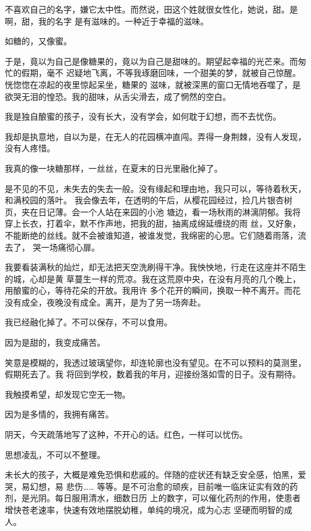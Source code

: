 		不喜欢自己的名字，嫌它太中性。而然说，田这个姓就很女性化，她说，甜。是啊，甜，我的名字
	是有滋味的。一种近于幸福的滋味。

		如糖的，又像蜜。

		于是，竟以为自己是像糖果的，竟以为自己是甜味的。期望起幸福的光芒来。而匆忙的假期，毫不
	迟疑地飞离，不等我琢磨回味，一个甜美的梦，就被自己惊醒。恍惚惚在凉起的夜里惊起呆坐，糖果的
	滋味，就被深黑的窗口无情地吞噬了，是欲哭无泪的惶恐。我的甜味，从舌尖滑去，成了惘然的空白。

		我是独自酿蜜的孩子，没有长大，没有学会，如何耽于幻想，而不去忧伤。

		我却是执意地，自以为是，在无人的花园横冲直闯。弄得一身荆棘，没有人发现，没有人疼惜。

		我真的像一块糖那样，一丝丝，在夏末的日光里融化掉了。

		是不见的不见，未失去的失去一般。没有缘起和理由地，我只可以，等待着秋天，和满校园的落叶。
	我会像去年，在透明的午后，从樱花园经过，捡几片银杏树页，夹在日记薄。会一个人站在来园的小池
	塘边，看一场秋雨的淋漓阴郁。我将穿上长衣，打着伞，默不作声地，把我的甜，抽离成绵延缠绕的雨
	丝，又好象，不能断绝的丝线。就不会被谁知道，被谁发觉，我绵密的心思。它们随着雨落，流去了，
	哭一场痛彻心扉。


		我要看装满秋的灿烂，却无法把天空洗刷得干净。我怏怏地，行走在这座并不陌生的城，心却是黄
	草蔓生一样的荒凉。我在这荒原中央，在没有月亮的几个晚上，用酿蜜的心，等待花朵的开放。我用许
	多个花开的瞬间，换取一种不离开。而花没有成全，夜晚没有成全。离开，是为了另一场奔赴。

		我已经融化掉了。不可以保存，不可以食用。

		因为是甜的，我变成痛苦。

		笑意是模糊的，我透过玻璃望你，却连轮廓也没有望见。在不可以预料的莫测里，假期死去了。我
	将回到学校，数着我的年月，迎接纷落如雪的日子。没有期待。

		我触摸希望，却发现它空无一物。

		因为是多情的，我拥有痛苦。

		阴天，今天疏落地写了这种，不开心的话。红色，一样可以忧伤。

	\endwriting



		思想凌乱，不可以不整理。


		未长大的孩子，大概是难免恐惧和悲戚的。伴随的症状还有缺乏安全感，怕黑，爱哭，易幻想，易
	悲伤…… 等等。是不可治愈的顽疾，目前唯一临床证实有效的药剂，是光阴。每日服用清水，细数日历
	上的数字，可以催化药剂的作用，使患者增快苍老速率，快速有效地摆脱幼稚，单纯的境况，成为心志
	坚硬而明智的成人。

